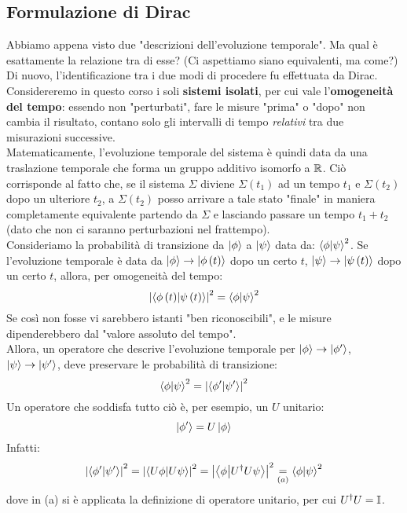 \documentclass[../../FisicaTeorica.tex]{subfiles}
\begin{document}
\subsection{Formulazione di Dirac}
Abbiamo appena visto due "descrizioni dell'evoluzione temporale". Ma qual è esattamente la relazione tra di esse? (Ci aspettiamo siano equivalenti, ma come?)\\
Di nuovo, l'identificazione tra i due modi di procedere fu effettuata da Dirac.\\
Considereremo in questo corso i soli \textbf{sistemi isolati}, per cui vale l'\textbf{omogeneità del tempo}: essendo non "perturbati", fare le misure "prima" o "dopo" non cambia il risultato, contano solo gli intervalli di tempo \textit{relativi} tra due misurazioni successive.\\ Matematicamente, l'evoluzione temporale del sistema è quindi data da una traslazione temporale che forma un gruppo additivo isomorfo a $\mathbb{R}$.
Ciò corrisponde al fatto che, se il sistema $\Sigma$ diviene $\Sigma\left(t_1\right)$ ad un tempo $t_1$ e $\Sigma\left(t_2\right)$ dopo un ulteriore $t_2$, a $\Sigma\left(t_2\right)$ posso arrivare a tale stato "finale" in maniera completamente equivalente partendo da $\Sigma$ e lasciando passare un tempo $t_1+t_2$ (dato che non ci saranno perturbazioni nel frattempo).\\

Consideriamo la probabilità di transizione da $\ket{\phi}$ a $\ket{\psi}$ data da: $\braket{\phi|\psi}^2$. 
Se l'evoluzione temporale è data da $\ket{\phi}\to \ket{\phi \left(t\right)}$ dopo un certo $t$, $\ket{\psi}\to \ket{\psi\left(t\right)}$ dopo un certo $t$, allora, per omogeneità del tempo:
\[
\left|\left\langle\phi\left(t\right)\middle|\psi\left(t\right)\right\rangle\right|^2=\braket{\phi|\psi}^2
\]
Se così non fosse vi sarebbero istanti "ben riconoscibili", e le misure dipenderebbero dal "valore assoluto del tempo".\\

Allora, un operatore che descrive l'evoluzione temporale per $\ket{\phi}\to |\phi^\prime\rangle$, $\ket{\psi}\to |\psi^\prime\rangle$, deve preservare le probabilità di transizione:
\[
\braket{\phi|\psi}^2=\left|\left\langle\phi^\prime\middle|\psi^\prime\right\rangle\right|^2
\]
Un operatore che soddisfa tutto ciò è, per esempio, un $U$ unitario:
\[
\left|\phi^\prime\right\rangle=U\ket{\phi}
\]
Infatti:
\begin{equation}
\left|\left\langle\phi^\prime\middle|\psi^\prime\right\rangle\right|^2=\left|\left\langle U\phi\middle| U\psi\right\rangle\right|^2=\left|\left\langle\phi\middle| U^\dag U\psi\right\rangle\right|^2\underset{(a)}{=}\braket{\phi|\psi}^2
\label{eqn:prob-unitario}
\end{equation}
dove in (a) si è applicata la definizione di operatore unitario, per cui $U^\dag U=\mathbb{I}$.\\
\end{document}

